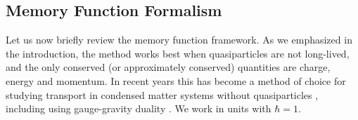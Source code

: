 \documentclass[10pt, oneside]{book}
\begin{document}
\begin{doublespace}
\section{Memory Function Formalism}
\label{sec:formalism}

Let us now briefly review the memory function framework.  As we emphasized in the introduction, the method works best when quasiparticles are not long-lived, and the only conserved (or approximately conserved) quantities are charge, energy and momentum.   In recent years this has become a method of choice for studying transport in condensed matter systems without quasiparticles \cite{hkms, rosch2007, Hartnoll:2014gba,Patel:2014jfa}, including using gauge-gravity duality \cite{Hartnoll:2008hs, Hartnoll:2012rj, Blake:2013owa, Davison:2013txa, lucas1401}.    We work in units with $\hbar=1$.


\end{doublespace}
\end{document}
